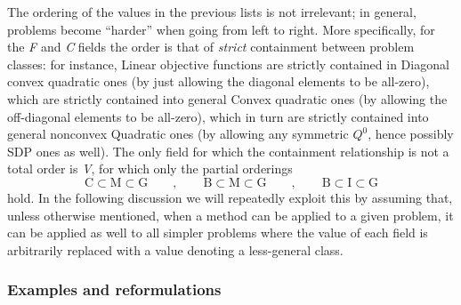 The ordering of the values in the previous lists is not irrelevant; in general, problems become ``harder'' when going from left to right. More specifically, for the \textit{F} and \textit{C} fields the order is that of \emph{strict} containment between problem classes: for instance, Linear objective functions are strictly contained in Diagonal convex quadratic ones (by just allowing the diagonal elements to be all-zero), which are strictly contained into general Convex quadratic ones (by allowing the off-diagonal elements to be all-zero), which in turn are strictly contained into general nonconvex Quadratic ones (by allowing any symmetric $Q^0$, hence possibly SDP ones as well). The only field for which the containment relationship is not a total order is \textit{V}, for which only the partial orderings
\[
 \mbox{C} \subset \mbox{M} \subset \mbox{G}
 \qquad,\qquad
 \mbox{B} \subset \mbox{M} \subset \mbox{G}
 \qquad,\qquad
 \mbox{B} \subset \mbox{I} \subset \mbox{G}
\]
hold. In the following discussion we will repeatedly exploit this by assuming that, unless otherwise mentioned, when a method can be applied to a given problem, it can be applied as well to all simpler problems where the value of each field is arbitrarily replaced with a value denoting a less-general class.

\subsubsection{Examples and reformulations}\label{ssec:reform}

